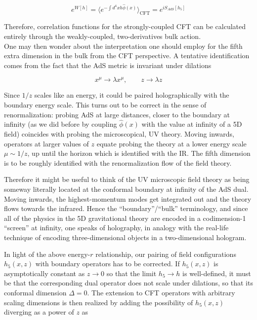 \begin{equation}
	e^{W[h]} = \langle e^{-\int d^4 x h \hat \phi(x)} \rangle_\text{CFT} = e^{iS_{AdS}[h_5]}
	\label{}
\end{equation}

Therefore, correlation functions for the strongly-coupled CFT can be calculated entirely through the weakly-coupled, two-derivatives bulk action.\\

One may then wonder about the interpretation one should employ for the fifth extra dimension in the bulk from the CFT perspective. A tentative identification comes from the fact that the AdS metric is invariant under dilations

\begin{equation}
	x^\mu \rightarrow \lambda x^\mu, \quad \quad z \rightarrow \lambda z
	\label{}
\end{equation}

Since $1/z$ scales like an energy, it could be paired holographically with the boundary energy scale. This turns out to be correct in the sense of renormalization: probing AdS at large distances, closer to the boundary at infinity (as we did before by coupling $\hat\phi(x)$ with the value at infinity of a 5D field) coincides with probing the microscopical, UV theory. Moving inwards, operators at larger values of $z$ equate probing the theory at a lower energy scale $\mu \sim 1/z$, up until the horizon which is identified with the IR. The fifth dimension is to be roughly identified with the renormalization flow of the field theory.

Therefore it might be useful to think of the UV microscopic field theory as being someway literally located at the conformal boundary at infinity of the AdS dual. Moving inwards, the highest-momentum modes get integrated out and the theory flows towards the infrared. Hence the ``boundary''/``bulk'' terminology, and since all of the physics in the 5D gravitational theory are encoded in a codimension-1 ``screen'' at infinity, one speaks of holography, in analogy with the real-life technique of encoding three-dimensional objects in a two-dimensional hologram.

In light of the above energy-$r$ relationship, our pairing of field configurations $h_5(x,z)$ with boundary operators has to be corrected. If $h_5(x,z)$ is asymptotically constant as $z\rightarrow 0$ so that the limit $h_5 \rightarrow h$ is well-defined, it must be that the corresponding dual operator does not scale under dilations, so that its conformal dimension $\Delta = 0$. The extension to CFT operators with arbitrary scaling dimensions is then realized by adding the possibility of $h_5(x,z)$ diverging as a power of $z$ as

